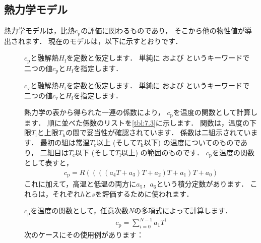 \subsection{熱力学モデル}
\label{ssec:7.1.3@3.0.1}
熱力学モデルは，比熱$c_{\mathrm{p}}$の評価に関わるものであり，
そこから他の物性値が導出されます．
現在のモデルは，以下に示すとおりです．
\begin{description}
 \item[]
            $c_{\mathrm{p}}$と融解熱$H_{\mathrm{f}}$を定数と仮定します．
            単純に
%
%
            および
%
%
            というキーワードで
            二つの値$c_{\mathrm{p}}$と$H_{\mathrm{f}}$を指定します．
 \item[]
            $c_{\mathrm{v}}$と融解熱$H_{\mathrm{f}}$を定数と仮定します．
            単純に
%
%
            および
%
%
            というキーワードで
            二つの値$c_{\mathrm{v}}$と$H_{\mathrm{f}}$を指定します．
 \item[]
            熱力学の表から得られた一連の係数により，
            $c_{\mathrm{p}}$を温度の関数として計算します．
            順に並べた係数のリストを\autoref{tbl:7.3}に示します．
            関数は，温度の下限$T_{\mathrm{l}}$と上限$T_{\mathrm{h}}$の間で妥当性が確認されています．
            係数は二組示されています．
            最初の組は常温$T_{\mathrm{c}}$以上 (そして$T_{\mathrm{h}}$以下) の温度についてのものであり，
            二組目は$T_{\mathrm{c}}$以下 (そして$T_{\mathrm{l}}$以上) の範囲のものです．
            $c_{\mathrm{p}}$を温度の関数として表すと，
\begin{align}
 \label{eq:7.1}
 c_{\mathrm{p}} = R((((a_{4}T + a_{3})T + a_{2})T + a_{1})T + a_{0})
\end{align}
            これに加えて，高温と低温の両方に$a_{5}$，$a_{6}$という積分定数があります．
            これらは，それぞれ$h$と$s$を評価するために使われます．
 \item[]
            $c_{\mathrm{p}}$を温度の関数として，任意次数$N$の多項式によって計算します．
\begin{align}
 \label{eq:7.4@3.0.1}
 c_{\mathrm{p}} = \sum^{N-1}_{i=0}a_{1}T^{i}
\end{align}
            次のケースにその使用例があります：\\
            \hfil{}
\end{description}


